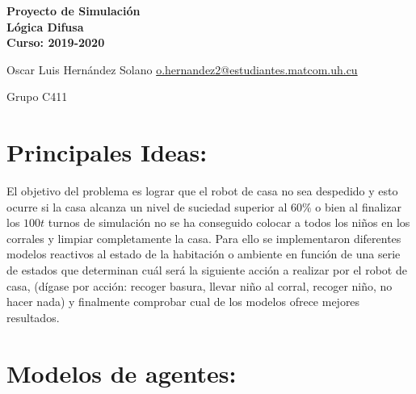 \documentclass[10pt,letterpaper]{article}
\begin{document}
\begin{center}
	\textbf{Proyecto de Simulación}\\
	\textbf{Lógica Difusa}\\
	\textbf{Curso: 2019-2020}\\
\end{center}
		
\vspace{1.5cm}
		
Oscar Luis Hernández Solano \hspace{0.7cm}
\href{mailto:o.hernandez2@estudiantes.matcom.uh.cu}{o.hernandez2@estudiantes.matcom.uh.cu}

Grupo C411\\


\section{Principales Ideas:}
El objetivo del problema es lograr que el robot de casa no sea despedido y esto ocurre si la casa alcanza un nivel de suciedad superior al $60 \%$ o bien al finalizar los $100t$ turnos de simulación no se ha conseguido colocar a todos los niños en los corrales y limpiar completamente la casa. Para ello se implementaron diferentes modelos reactivos al estado de la habitación o ambiente en función de una serie de estados que determinan cuál será la siguiente acción a realizar por el robot de casa, (dígase por acción: recoger basura, llevar niño al corral, recoger niño, no hacer nada) y finalmente comprobar cual de los modelos ofrece mejores resultados.

\section{Modelos de agentes:}
\end{document}
